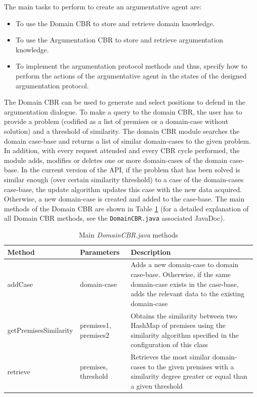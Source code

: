 The main tasks to perform to create an argumentative agent are:
\begin{itemize}
 \item To use the Domain CBR to store and retrieve domain knowledge.
 \item To use the Argumentation CBR to store and retrieve argumentation knowledge.
 \item To implement the argumentation protocol methods and thus, specify how to perform the actions of the argumentative agent in the states of the designed argumentation protocol.
\end{itemize}

The Domain CBR can be used to generate and select positions to defend in the argumentation dialogue. To make a query to the domain CBR, the user has to provide a problem (codified as a list of premises or a domain-case without solution) and a threshold of similarity. The domain CBR module searches the domain case-base and returns a list of similar domain-cases to the given problem. In addition, with every request attended and every CBR cycle performed, the module adds, modifies or deletes one or more domain-cases of the domain case-base. In the current version of the API, if the problem that has been solved is similar enough (over certain similarity threshold) to a case of the domain-cases case-base, the update algorithm updates this case with the new data acquired. Otherwise, a new domain-case is created and added to the case-base.
The main methods of the Domain CBR are shown in Table \ref{tab:DomainCBRMethods} (for a detailed explanation of all Domain CBR methods, see the \lstinline{DomainCBR.java} associated JavaDoc).
\begin{table}[h!t]
\begin{tabular}{|l|l|p{6cm}|}
\hline
\textbf{Method} & \textbf{Parameters} & \textbf{Description} \\ \hline
addCase & domain-case & Adds a new domain-case to domain case-base. Otherwise, if the same domain-case exists in the case-base, adds the relevant data to the existing domain-case \\ \hline
getPremisesSimilarity & premises1, premises2 & Obtains the similarity between two HashMap of premises using the similarity algorithm specified in the configuration of this class \\ \hline
retrieve & premises, threshold & Retrieves the most similar domain-cases to the given premises with a similarity degree greater or equal than a given threshold \\ \hline
\end{tabular}
\caption{Main \textit{DomainCBR.java} methods}
\label{tab:DomainCBRMethods}
\end{table}

